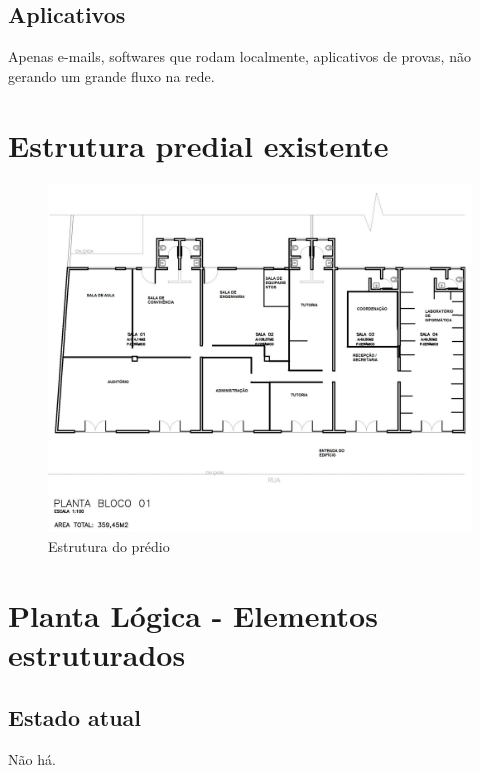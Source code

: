 \documentclass[	DIV=calc,%
							paper=a4,%
							fontsize=12pt,%
							onecolumn]{scrartcl}	 					%
\begin{document}
\subsection{Aplicativos}
Apenas e-mails, softwares que rodam localmente, aplicativos de provas, não gerando um grande fluxo na rede.


\section{Estrutura predial existente}
\begin{figure}[H]
	\centering
	\includegraphics[scale=0.25]{planta1}
	\caption{Estrutura do prédio}
	\label{planta1}
\end{figure}

\section{Planta Lógica - Elementos estruturados}

\subsection{Estado atual}
Não há.
\end{document}
